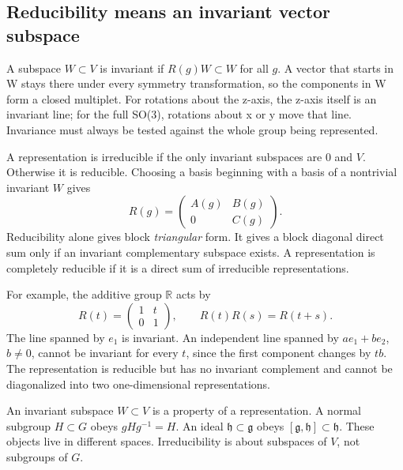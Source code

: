 \documentclass[11pt]{article}
\newcommand{\R}{\mathbb{R}}
\newcommand{\lieg}{\mathfrak g}
\newcommand{\lieh}{\mathfrak h}
\begin{document}
\subsection{Reducibility means an invariant vector subspace}
A subspace \(W\subset V\) is invariant if \(R(g)W\subset W\) for all
\(g\). A vector that starts in W stays there under every symmetry
transformation, so the components in W form a closed multiplet.
For rotations about the z-axis, the z-axis itself is an invariant line;
for the full SO(3), rotations about x or y move that line. Invariance
must always be tested against the whole group being represented.

A representation is irreducible if the only invariant subspaces
are \(0\) and \(V\). Otherwise it is reducible.
Choosing a basis beginning with a basis of a nontrivial invariant \(W\)
gives
\begin{equation}
R(g)=\begin{pmatrix}A(g)&B(g)\\0&C(g)\end{pmatrix}.
\label{eq:upperBlock}
\end{equation}
Reducibility alone gives block \emph{triangular} form. It gives a block
diagonal direct sum only if an invariant complementary subspace exists.
A representation is completely reducible if it is a direct sum of
irreducible representations.

For example, the additive group \(\R\) acts by
\begin{equation}
R(t)=\begin{pmatrix}1&t\\0&1\end{pmatrix},\qquad
R(t)R(s)=R(t+s).
\label{eq:shear}
\end{equation}
The line spanned by \(e_1\) is invariant. An independent line spanned by
\(ae_1+be_2\), \(b\ne0\), cannot be invariant for every \(t\), since
the first component changes by \(tb\). The representation is reducible
but has no invariant complement and cannot be diagonalized into two
one-dimensional representations.

\begin{warningbox}
An invariant subspace \(W\subset V\) is a property of a representation.
A normal subgroup \(H\subset G\) obeys \(gHg^{-1}=H\).
An ideal \(\lieh\subset\lieg\) obeys \([\lieg,\lieh]\subset\lieh\).
These objects live in different spaces. Irreducibility is about subspaces
of \(V\), not subgroups of \(G\).
\end{warningbox}
\end{document}
